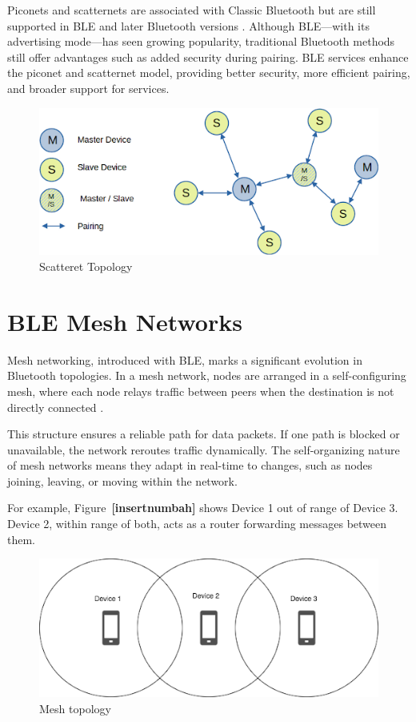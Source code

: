 Piconets and scatternets are associated with Classic Bluetooth but are still supported in BLE and later Bluetooth versions \cite{nextgenBLE}. Although BLE—with its advertising mode—has seen growing popularity, traditional Bluetooth methods still offer advantages such as added security during pairing. BLE services enhance the piconet and scatternet model, providing better security, more efficient pairing, and broader support for services.

\begin{figure}[h]
    \caption{Scatteret Topology}
    \includegraphics{scatternet.png}
    \end{figure}

\section{BLE Mesh Networks}

Mesh networking, introduced with BLE, marks a significant evolution in Bluetooth topologies. In a mesh network, nodes are arranged in a self-configuring mesh, where each node relays traffic between peers when the destination is not directly connected \cite{buildingBLEsystems}.

This structure ensures a reliable path for data packets. If one path is blocked or unavailable, the network reroutes traffic dynamically. The self-organizing nature of mesh networks means they adapt in real-time to changes, such as nodes joining, leaving, or moving within the network.

For example, Figure~\textbf{[insertnumbah]} shows Device 1 out of range of Device 3. Device 2, within range of both, acts as a router forwarding messages between them.
\begin{figure}[h]
    \caption{Mesh topology}
    \includegraphics{mesh.png}
    \end{figure}

